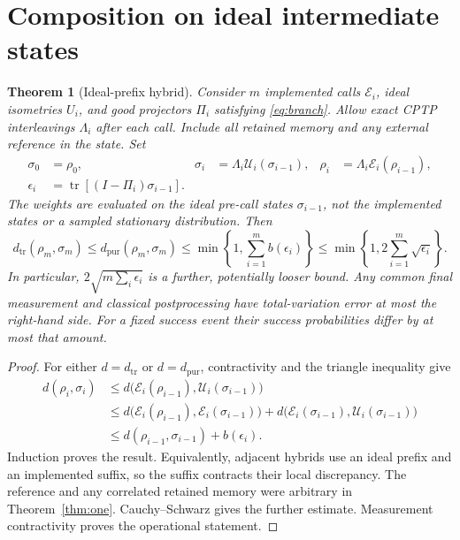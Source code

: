 \documentclass[11pt]{article}
\newtheorem{theorem}{Theorem}
\newcommand{\tr}{\operatorname{tr}}
\newcommand{\Dtr}{d_{\mathrm{tr}}}
\newcommand{\Dpur}{d_{\mathrm{pur}}}
\newcommand{\EE}{\mathcal E}
\newcommand{\UU}{\mathcal U}
\begin{document}
\section{Composition on ideal intermediate states}

\begin{theorem}[Ideal-prefix hybrid]\label{thm:hybrid}
Consider $m$ implemented calls $\EE_i$, ideal isometries $U_i$, and good projectors $\Pi_i$ satisfying \eqref{eq:branch}. Allow exact CPTP interleavings $\Lambda_i$ after each call. Include all retained memory and any external reference in the state. Set
\begin{align}
 \sigma_0&=\rho_0, &
 \sigma_i&=\Lambda_i\UU_i(\sigma_{i-1}), &
 \rho_i&=\Lambda_i\EE_i(\rho_{i-1}),\\
 \epsilon_i&=\tr[(I-\Pi_i)\sigma_{i-1}].&&&
 \label{eq:ideal-prefix}
\end{align}
The weights are evaluated on the \emph{ideal} pre-call states $\sigma_{i-1}$, not the implemented states or a sampled stationary distribution. Then
\begin{equation}
 \Dtr(\rho_m,\sigma_m)\leq\Dpur(\rho_m,\sigma_m)
 \leq\min\left\{1,\sum_{i=1}^m b(\epsilon_i)\right\}
 \leq\min\left\{1,2\sum_{i=1}^m\sqrt{\epsilon_i}\right\}.
 \label{eq:hybrid}
\end{equation}
In particular, $2\sqrt{m\sum_i\epsilon_i}$ is a further, potentially looser bound. Any common final measurement and classical postprocessing have total-variation error at most the right-hand side. For a fixed success event their success probabilities differ by at most that amount.
\end{theorem}
\begin{proof}
For either $d=\Dtr$ or $d=\Dpur$, contractivity and the triangle inequality give
\begin{align}
 d(\rho_i,\sigma_i)
 &\leq d\bigl(\EE_i(\rho_{i-1}),\UU_i(\sigma_{i-1})\bigr)\\
 &\leq d\bigl(\EE_i(\rho_{i-1}),\EE_i(\sigma_{i-1})\bigr)
       +d\bigl(\EE_i(\sigma_{i-1}),\UU_i(\sigma_{i-1})\bigr)\\
 &\leq d(\rho_{i-1},\sigma_{i-1})+b(\epsilon_i).
\end{align}
Induction proves the result. Equivalently, adjacent hybrids use an ideal prefix and an implemented suffix, so the suffix contracts their local discrepancy. The reference and any correlated retained memory were arbitrary in Theorem~\ref{thm:one}. Cauchy--Schwarz gives the further estimate. Measurement contractivity proves the operational statement.
\end{proof}
\end{document}
